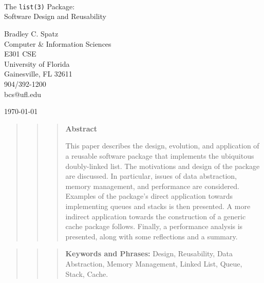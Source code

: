 %
%


\pagestyle{empty}
\begin{center}
\LARGE{
\ \\
\ \\
\ \\
The {\tt list(3)} Package:\\
Software Design and Reusability
}

\bigskip
\bigskip
\large{
Bradley C. Spatz\\
Computer \& Information Sciences\\
E301 CSE\\
University of Florida\\
Gainesville, FL 32611\\
904/392-1200\\
bcs@ufl.edu

\bigskip
\today
}
\end{center}

\vspace{1in}
\begin{quote} \begin{quote} \begin{quote}
\begin{centering}
{\bf Abstract}\\
\end{centering}
\medskip
This paper describes the design, evolution, and application of a reusable
software package that implements the ubiquitous doubly-linked list.  The
motivations and design of the package are discussed.  In particular, issues
of data abstraction, memory management, and performance are considered.
\medskip\\
Examples of the package's direct application towards implementing queues and
stacks is then presented.  A more indirect application towards the
construction of a generic cache package follows.  Finally, a performance
analysis is presented, along with some reflections and a summary.
\end{quote} \end{quote} \end{quote}

\vspace{.5in}
\begin{quote} \begin{quote} \begin{quote}
{\bf Keywords and Phrases:} Design, Reusability, Data Abstraction, Memory
Management, Linked List, Queue, Stack, Cache.
\end{quote} \end{quote} \end{quote}

